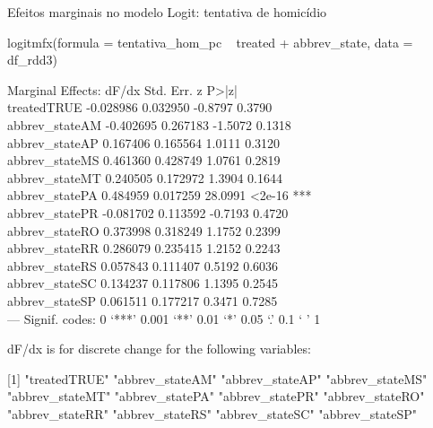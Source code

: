 \documentclass{beamer}
\begin{document}
\begin{frame}{Efeitos marginais no modelo Logit: tentativa de homicídio}
	\begin{tiny}
logitmfx(formula = tentativa_hom_pc ~ treated + abbrev_state, 
data = df_rdd3)

Marginal Effects:
dF/dx Std. Err.       z  P>|z|    \\
treatedTRUE    -0.028986  0.032950 -0.8797 0.3790    \\
abbrev_stateAM -0.402695  0.267183 -1.5072 0.1318    \\
abbrev_stateAP  0.167406  0.165564  1.0111 0.3120    \\
abbrev_stateMS  0.461360  0.428749  1.0761 0.2819    \\
abbrev_stateMT  0.240505  0.172972  1.3904 0.1644    \\
abbrev_statePA  0.484959  0.017259 28.0991 <2e-16 ***\\
abbrev_statePR -0.081702  0.113592 -0.7193 0.4720    \\
abbrev_stateRO  0.373998  0.318249  1.1752 0.2399    \\
abbrev_stateRR  0.286079  0.235415  1.2152 0.2243    \\
abbrev_stateRS  0.057843  0.111407  0.5192 0.6036    \\
abbrev_stateSC  0.134237  0.117806  1.1395 0.2545    \\
abbrev_stateSP  0.061511  0.177217  0.3471 0.7285    \\
---
Signif. codes:  0 ‘***’ 0.001 ‘**’ 0.01 ‘*’ 0.05 ‘.’ 0.1 ‘ ’ 1

dF/dx is for discrete change for the following variables:

[1] "treatedTRUE"    "abbrev_stateAM" "abbrev_stateAP" "abbrev_stateMS"\\
[5] "abbrev_stateMT" "abbrev_statePA" "abbrev_statePR" "abbrev_stateRO"\\
[9] "abbrev_stateRR" "abbrev_stateRS" "abbrev_stateSC" "abbrev_stateSP"\\
\end{tiny}
\end{frame}
\end{document}
